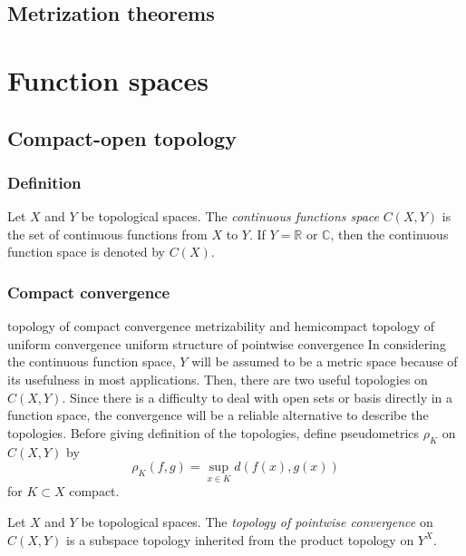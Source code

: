 \documentclass{../crs}
\begin{document}
\section{Metrization theorems}









\chapter{Function spaces}




\section{Compact-open topology}

\subsection{Definition}

\begin{defn}
Let $X$ and $Y$ be topological spaces.
The \emph{continuous functions space} $C(X,Y)$ is the set of continuous functions from $X$ to $Y$.
If $Y=\mathbb{R}$ or $\mathbb{C}$, then the continuous function space is denoted by $C(X)$.
\end{defn}

\subsection{Compact convergence}
topology of compact convergence
metrizability and hemicompact
topology of uniform convergence
uniform structure of pointwise convergence
In considering the continuous function space, $Y$ will be assumed to be a metric space because of its usefulness in most applications.
Then, there are two useful topologies on $C(X,Y)$.
Since there is a difficulty to deal with open sets or basis directly in a function space, the convergence will be a reliable alternative to describe the topologies.
Before giving definition of the topologies, define pseudometrics $\rho_K$ on $C(X,Y)$ by
\[\rho_K(f,g)=\sup_{x\in K}d(f(x),g(x))\]
for $K\subset X$ compact.

\begin{defn}
Let $X$ and $Y$ be topological spaces.
The \emph{topology of pointwise convergence} on $C(X,Y)$ is a subspace topology inherited from the product topology on $Y^X$.
\end{defn}
\end{document}
